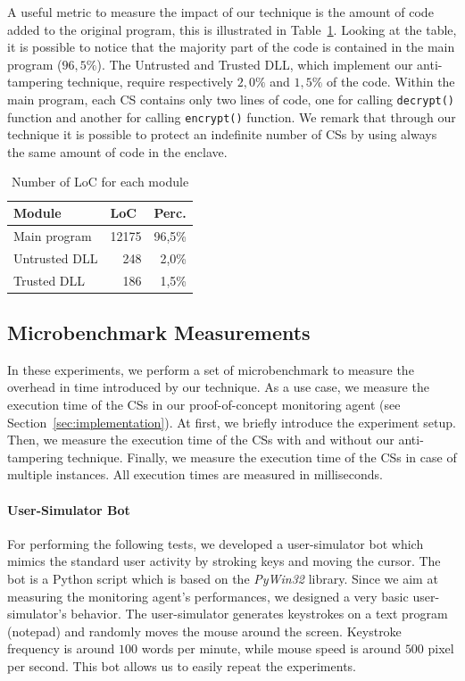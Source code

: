 A useful metric to measure the impact of our technique is the amount of code 
added to the original program, this is illustrated in Table~\ref{tbl:loc-stats}.
Looking at the table, it is possible to notice that the majority part of the 
code is contained in the main program ($96,5\%$).
The Untrusted and Trusted DLL, which implement our anti-tampering technique, 
require respectively $2,0\%$ and $1,5\%$ of the code.
Within the main program, each CS contains only two lines of code, one for 
calling \texttt{decrypt()} function and another for calling \texttt{encrypt()} 
function.
We remark that through our technique it is possible to protect an indefinite 
number of CSs by using always the same amount of code in the enclave.
~
\begin{table}[h]
	\center
	\caption{Number of LoC for each module}
	\label{tbl:loc-stats}
	\begin{tabular}{lrr}
		\toprule
		Module & \multicolumn{1}{l}{LoC} & \multicolumn{1}{l}{Perc.} \\
		\midrule
		Main program & 12175 & 96,5\% \\
		Untrusted DLL & 248 & 2,0\% \\
		Trusted DLL & 186 & 1,5\% \\
		\bottomrule
	\end{tabular}
\end{table}

\subsection{Microbenchmark Measurements}
In these experiments, we perform a set of microbenchmark to measure the 
overhead in time introduced by our technique.
As a use case, we measure the execution time of the CSs in our proof-of-concept 
monitoring agent (see Section~\ref{sec:implementation}).
At first, we briefly introduce the experiment setup.
Then, we measure the execution time of the CSs with and without our 
anti-tampering technique.
Finally, we measure the execution time of the CSs in case of multiple instances.
All execution times are measured in milliseconds.

\paragraph{\textbf{User-Simulator Bot}}
For performing the following tests, we developed a user-simulator bot which 
mimics the standard user activity by stroking keys and moving the cursor.
The bot is a Python script which is based on the \emph{PyWin32} library. %
Since we aim at measuring the monitoring agent's performances, we designed a 
very basic user-simulator's behavior.
The user-simulator generates keystrokes on a text program (\ie notepad) and 
randomly moves the mouse around the screen.
Keystroke frequency is around $100$ words per minute, while mouse speed is 
around $500$ pixel per second.
This bot allows us to easily repeat the experiments.

